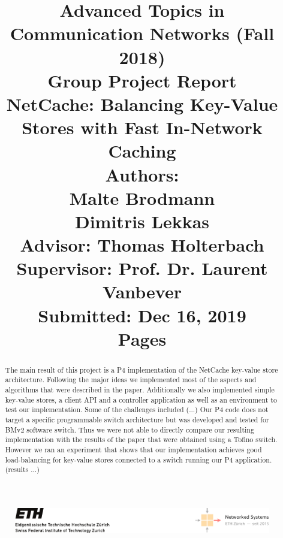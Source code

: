 \documentclass[11pt,oneside,a4paper]{article}
\title{
    \vspace*{0.0mm}
    \LARGE\bf\sf Advanced Topics in \\Communication Networks (Fall 2018)
    \vspace*{10.0mm} \\
    \Large\bf\sf Group Project Report \vspace*{30.0mm}\\
    \Huge\bf\sf NetCache: Balancing Key-Value Stores with Fast In-Network Caching
    \vspace*{30.0mm} \\
    \normalsize
    \sf Authors:\\[5pt]
    \sf Malte Brodmann \\ [5pt]
    \sf Dimitris Lekkas \vspace*{5mm}\\
    \sf  Advisor:  Thomas Holterbach \vspace*{5mm}\\
    \sf  Supervisor:  Prof. Dr. Laurent Vanbever \vspace*{20.0mm}\\
    \sf Submitted: Dec 16, 2019\\ [5pt]
    \sf \pageref{lastpage} Pages
}
\date{}
\begin{document}
\begin{figure}
    \includegraphics[width=\textwidth]{figures/eth-nsg-header}
\end{figure}

\maketitle
\thispagestyle{empty}
\raggedbottom
\clearpage


\begin{abstract}
The main result of this project is a P4 implementation of the NetCache key-value store architecture.
Following the major ideas we implemented most of the aspects and algorithms that were described in the paper.
Additionally we also implemented simple key-value stores, a client API and a controller application as well as an environment to test our implementation.
Some of the challenges included (...)
Our P4 code does not target a specific programmable switch architecture but was developed and tested for BMv2 software switch.
Thus we were not able to directly compare our resulting implementation with the results of the paper that were obtained using a Tofino switch.
However we ran an experiment that shows that our implementation achieves good load-balancing for key-value stores connected to a switch running our P4 application.
(results ...)

\end{abstract}

\clearpage
\setcounter{tocdepth}{2}
\tableofcontents
\clearpage
{}
\end{document}
